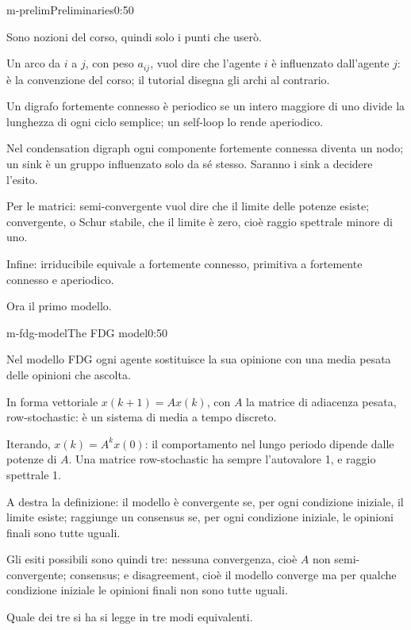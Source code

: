 \begin{slide}{m-prelim}{Preliminaries}{0:50}
  \begin{discorso}
    \item Sono nozioni del corso, quindi solo i punti che userò.
    \item Un arco da $i$ a $j$, con peso $a_{ij}$, vuol dire che l'agente $i$ è influenzato dall'agente $j$: è la convenzione del corso; il tutorial disegna gli archi al contrario.
    \item Un digrafo fortemente connesso è periodico se un intero maggiore di uno divide la lunghezza di ogni ciclo semplice; un self-loop lo rende aperiodico.
    \item Nel condensation digraph ogni componente fortemente connessa diventa un nodo; un sink è un gruppo influenzato solo da sé stesso. Saranno i sink a decidere l'esito.
    \item Per le matrici: semi-convergente vuol dire che il limite delle potenze esiste; convergente, o Schur stabile, che il limite è zero, cioè raggio spettrale minore di uno.
    \item Infine: irriducibile equivale a fortemente connesso, primitiva a fortemente connesso e aperiodico.
    \item Ora il primo modello.
  \end{discorso}
\end{slide}

\begin{slide}{m-fdg-model}{The FDG model}{0:50}
  \begin{discorso}
    \item Nel modello FDG ogni agente sostituisce la sua opinione con una media pesata delle opinioni che ascolta.
    \item In forma vettoriale $x(k+1)=Ax(k)$, con $A$ la matrice di adiacenza pesata, row-stochastic: è un sistema di media a tempo discreto.
    \item Iterando, $x(k)=A^kx(0)$: il comportamento nel lungo periodo dipende dalle potenze di $A$. Una matrice row-stochastic ha sempre l'autovalore 1, e raggio spettrale 1.
    \item A destra la definizione: il modello è convergente se, per ogni condizione iniziale, il limite esiste; raggiunge un consensus se, per ogni condizione iniziale, le opinioni finali sono tutte uguali.
    \item Gli esiti possibili sono quindi tre: nessuna convergenza, cioè $A$ non semi-convergente; consensus; e disagreement, cioè il modello converge ma per qualche condizione iniziale le opinioni finali non sono tutte uguali.
    \item Quale dei tre si ha si legge in tre modi equivalenti.
  \end{discorso}
\end{slide}

